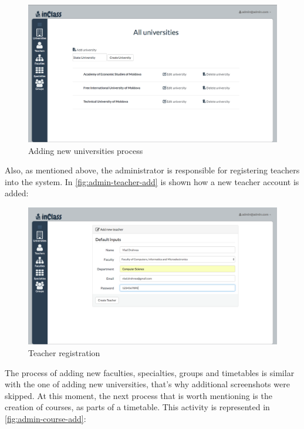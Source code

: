 \begin{figure}[H]
\centering
\includegraphics[width=14cm]{Chapter3/admin-university-add.png}
\caption{Adding new universities process}
\label{fig:admin-university-add}
\end{figure}

 Also, as mentioned above, the administrator is responsible for registering teachers into the system. In \autoref{fig:admin-teacher-add} is shown how a new teacher account is added:

\begin{figure}[H]
\centering
\includegraphics[width=14cm]{Chapter3/admin-teacher-add.png}
\caption{Teacher registration}
\label{fig:admin-teacher-add}
\end{figure}

The process of adding new faculties, specialties, groups and timetables is similar with the one of adding new universities, that's why additional screenshots were skipped. At this moment, the next process that is worth mentioning is the creation of courses, as parts of a timetable. This activity is represented in \autoref{fig:admin-course-add}:

